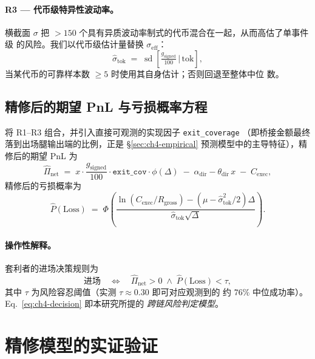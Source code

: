 \documentclass[11pt,a4paper]{ctexart}
\newcommand{\gsigned}{g_{\text{signed}}}
\newcommand{\Cexec}{C_{\text{exec}}}
\newcommand{\Rgross}{R_{\text{gross}}}
\begin{document}
\paragraph{R3 --- 代币级特异性波动率。} 横截面 $\sigma$ 把
$>\!150$ 个具有异质波动率制式的代币混合在一起，从而高估了单事件级
的风险。我们以代币级估计量替换 $\sigma_{\text{eff}}$：
\begin{equation}
\label{eq:ch4-sigma-token}
    \hat\sigma_{\text{tok}} \;=\;
    \operatorname{sd}\!\left[\tfrac{g_{\text{signed}}}{100}\,
    \Big|\,\text{tok}\right],
\end{equation}
当某代币的可靠样本数 $\geq 5$ 时使用其自身估计；否则回退至整体中位
数。

\subsection{精修后的期望 PnL 与亏损概率方程}

将 R1--R3 组合，并引入直接可观测的实现因子 \texttt{exit\_coverage}
（即桥接金额最终落到出场腿输出端的比例，正是 \S\ref{sec:ch4-empirical}
预测模型中的主导特征），精修后的期望 PnL 为
\begin{equation}
\label{eq:ch4-pi-hat}
    \widehat{\Pi}_{\text{net}} \;=\;
    x\cdot\frac{\gsigned}{100}
    \cdot\texttt{exit\_cov}\cdot\phi(\Delta)
    \;-\;\alpha_{\text{dir}} - \theta_{\text{dir}}\,x
    \;-\;\Cexec,
\end{equation}
精修后的亏损概率为
\begin{equation}
\label{eq:ch4-ploss-new}
    \widehat{P}(\text{Loss}) \;=\;
    \Phi\!\left(\frac{\ln(\Cexec/\Rgross) -
        (\mu - \hat\sigma_{\text{tok}}^{2}/2)\Delta}
        {\hat\sigma_{\text{tok}}\sqrt{\Delta}}\right).
\end{equation}

\paragraph{操作性解释。} 套利者的进场决策规则为
\begin{equation}
    \label{eq:ch4-decision}
    \text{进场}
    \quad\Longleftrightarrow\quad
    \widehat{\Pi}_{\text{net}} > 0 \;\wedge\; \widehat{P}(\text{Loss}) < \tau,
\end{equation}
其中 $\tau$ 为风险容忍阈值（实测 $\tau \approx 0.30$ 即可对应观测到的
约 $76\%$ 中位成功率）。Eq.~\eqref{eq:ch4-decision} 即本研究所提的
\textit{跨链风险判定模型}。

\section{精修模型的实证验证}
\label{sec:ch4-validation}
\end{document}
